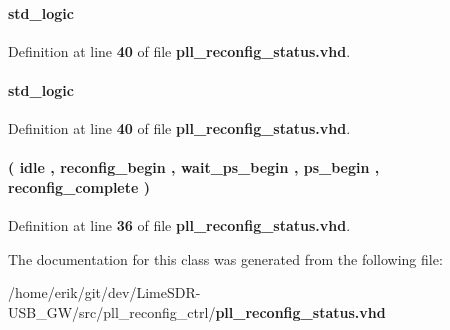 \paragraph[{scandone\+\_\+reg0}]{ {\bfseries \textcolor{comment}{std\+\_\+logic}\textcolor{vhdlchar}{ }} \hspace{0.3cm}{\ttfamily [Signal]}}\label{classpll__reconfig__status_1_1arch_a3a3be0db31d25f23e34117d58c1b8253}


Definition at line {\bf 40} of file {\bf pll\+\_\+reconfig\+\_\+status.\+vhd}.

\paragraph[{scandone\+\_\+reg1}]{ {\bfseries \textcolor{comment}{std\+\_\+logic}\textcolor{vhdlchar}{ }} \hspace{0.3cm}{\ttfamily [Signal]}}\label{classpll__reconfig__status_1_1arch_ad1df4a27f6245d720410cf18ad685e96}


Definition at line {\bf 40} of file {\bf pll\+\_\+reconfig\+\_\+status.\+vhd}.

\paragraph[{state\+\_\+type}]{ {\bfseries \textcolor{vhdlchar}{(}\textcolor{vhdlchar}{ }\textcolor{vhdlchar}{idle}\textcolor{vhdlchar}{ }\textcolor{vhdlchar}{,}\textcolor{vhdlchar}{ }\textcolor{vhdlchar}{reconfig\+\_\+begin}\textcolor{vhdlchar}{ }\textcolor{vhdlchar}{,}\textcolor{vhdlchar}{ }\textcolor{vhdlchar}{wait\+\_\+ps\+\_\+begin}\textcolor{vhdlchar}{ }\textcolor{vhdlchar}{,}\textcolor{vhdlchar}{ }\textcolor{vhdlchar}{ps\+\_\+begin}\textcolor{vhdlchar}{ }\textcolor{vhdlchar}{,}\textcolor{vhdlchar}{ }\textcolor{vhdlchar}{reconfig\+\_\+complete}\textcolor{vhdlchar}{ }\textcolor{vhdlchar}{)}\textcolor{vhdlchar}{ }} \hspace{0.3cm}{\ttfamily [Type]}}\label{classpll__reconfig__status_1_1arch_a65ebda908b4034d25ab2b5a3b1fce59f}


Definition at line {\bf 36} of file {\bf pll\+\_\+reconfig\+\_\+status.\+vhd}.



The documentation for this class was generated from the following file\+:\begin{DoxyCompactItemize}
\item 
/home/erik/git/dev/\+Lime\+S\+D\+R-\/\+U\+S\+B\+\_\+\+G\+W/src/pll\+\_\+reconfig\+\_\+ctrl/{\bf pll\+\_\+reconfig\+\_\+status.\+vhd}\end{DoxyCompactItemize}
